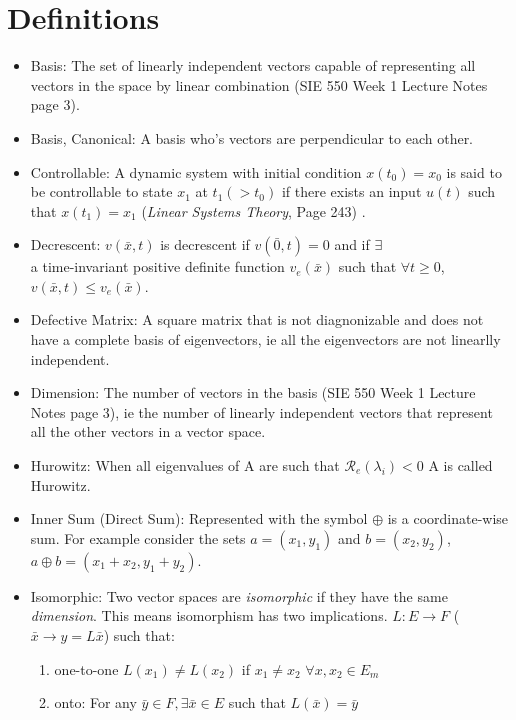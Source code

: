 \documentclass[12pt]{article}
\begin{document}
\section*{Definitions}

\begin{itemize}

\item Basis: The set of linearly independent vectors capable of representing all vectors in the space by linear combination (SIE 550 Week 1 Lecture Notes page 3).

\item Basis, Canonical: A basis who's vectors are perpendicular to each other. 

\item Controllable: A dynamic system with initial condition $x(t_0)=x_0$ is said to be controllable to state $x_1$ at $t_1(>t_0)$ if there exists an input $u(t)$ such that $x(t_1)=x_1$ ({\em Linear Systems Theory}, Page 243)  .

\item Decrescent: $v(\bar{x},t)$ is decrescent if $v(\bar{0},t)=0$ and if $\exists$ \\ a time-invariant positive definite function $v_e(\bar{x})$ such that $\forall t\geq0$, $v(\bar{x},t)\leq v_e(\bar{x})$.

\item Defective Matrix: A square matrix that is not diagnonizable and does not have a complete basis of eigenvectors, ie all the eigenvectors are not linearlly independent. 

\item Dimension: The number of vectors in the basis (SIE 550 Week 1 Lecture Notes page 3), ie the number of linearly independent vectors that represent all the other vectors in a vector space.

\item Hurowitz: When all eigenvalues of A are such that $\mathcal{R}_e(\lambda_i)<0$ A is called Hurowitz. 

\item Inner Sum (Direct Sum): Represented with the symbol $\oplus$ is a coordinate-wise sum. For example consider the sets $a=(x_1,y_1)$ and $b=(x_2, y_2)$, $a\oplus b=(x_1+x_2,y_1+y_2)$.

\item Isomorphic: Two vector spaces are {\em isomorphic} if they have the same {\em dimension}. This means isomorphism has two implications. $L:E\rightarrow F$ ($\bar{x}\rightarrow y=L\bar{x}$) such that:
\begin{enumerate}
	\item one-to-one $L(x_1)\neq L(x_2)$ if $x_1\neq x_2$ $\forall x, x_2 \in E_m$
	\item onto: For any $\bar{y} \in F, \exists \bar{x} \in E$ such that $L(\bar{x})=\bar{y}$
\end {enumerate}


\end{itemize}
\end{document}
